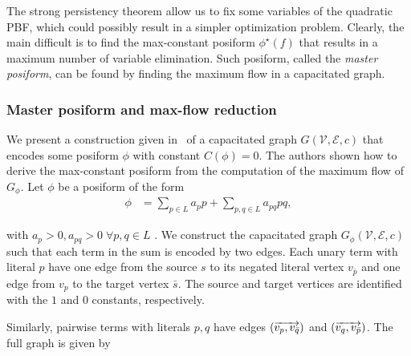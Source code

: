 The strong persistency theorem allow us to fix some variables of the quadratic PBF, which could possibly result in a simpler optimization problem. Clearly, the main difficult is to find the max-constant posiform $\phi^{\star}(f)$ that results in a maximum number of variable elimination. Such posiform, called the \emph{master posiform}, can be found by finding the maximum flow in a capacitated graph.

\subsubsection{Master posiform and max-flow reduction}

We present a construction given in~\cite{boros91,boros02pseudo} of a capacitated graph $G(\mathcal{V},\mathcal{E},c)$ that encodes some posiform $\phi$ with constant $C(\phi)=0$. The authors shown how to derive the max-constant posiform from the computation of the maximum flow of $G_{\phi}$. Let $\phi$ be a posiform of the form
	\begin{align*}
		\phi &= \sum_{p \in L}{a_pp} + \sum_{p,q \in L}{a_{pq}pq},
	\end{align*}
	
with $a_p >0, a_{pq}>0\; \forall p,q \in L$	. We  construct the capacitated graph $G_{\phi}(\mathcal{V},\mathcal{E},c)$ such that each term in the sum is encoded by two edges. Each unary term with literal $p$ have one edge from the source $s$ to its negated literal vertex $v_{\bar{p}}$ and one edge from $v_p$ to the target vertex $\bar{s}$. The source and target vertices are identified with the $1$ and $0$ constants, respectively. 

\begin{center}
\end{center}

Similarly, pairwise terms with literals $p,q$ have edges $( \overrightarrow{ v_p,v_{\bar{q}}} ) $ and $( \overrightarrow{ v_q,v_{\bar{p}}} )$. The full graph is given by

